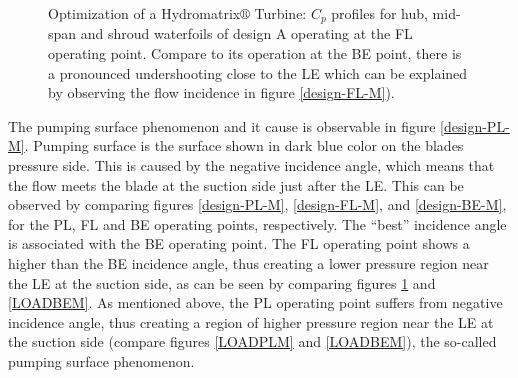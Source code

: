 \begin{figure}[h!]
\begin{minipage}[b]{1\linewidth}
 \centering
\end{minipage}
\caption{Optimization of a Hydromatrix$\circledR$ Turbine: $C_p$ profiles for hub, mid-span and shroud waterfoils of design A operating at the FL operating point. Compare to its operation at the BE point, there is a pronounced undershooting close to the LE which can be explained by observing the flow incidence in figure \ref{design-FL-M}).}
\label{LOADFLM}
\end{figure}

The pumping surface phenomenon and it cause is observable in figure \ref{design-PL-M}. Pumping surface is the surface shown in dark blue color on the blades pressure side. This is caused by the negative incidence angle, which means that the flow meets the blade at the suction side just after the LE. This can be observed by comparing figures \ref{design-PL-M}, \ref{design-FL-M}, and \ref{design-BE-M}, for the  PL, FL and BE operating points, respectively. The ``best'' incidence angle is associated with the BE operating point. The FL operating point shows a higher than the BE incidence angle, thus creating a lower pressure region near the LE at the suction side, as can be seen by comparing figures \ref{LOADFLM} and \ref{LOADBEM}. As mentioned above, the PL operating point suffers from negative incidence angle, thus creating a region of higher pressure region near the LE at the suction side (compare figures \ref{LOADPLM} and \ref{LOADBEM}), the so-called pumping surface phenomenon.    



